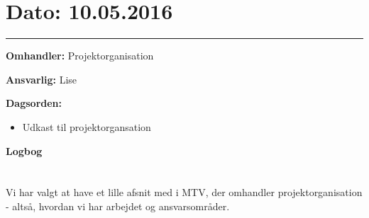 

\section{Dato: 10.05.2016}
\hrule

\textbf{Omhandler:} Projektorganisation

\textbf{Ansvarlig:} Lise

\textbf{Dagsorden:}
\begin{itemize}
	\item Udkast til projektorgansation
\end{itemize}

\textbf{Logbog}
\\
\\ \\
Vi har valgt at have et lille afsnit med i MTV, der omhandler projektorganisation - altså, hvordan vi har arbejdet og ansvarsområder. 



